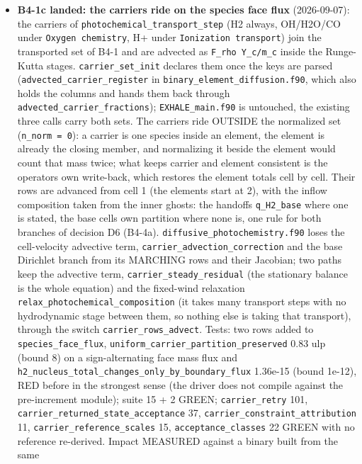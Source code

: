 \documentclass[english,a4paper]{my_memo}
\begin{document}
\begin{itemize}
\item
  \textbf{B4-1c landed: the carriers ride on the species face flux} (2026-09-07):
  the carriers of \texttt{photochemical\_transport\_step} (H2 always, OH/H2O/CO under
  \texttt{Oxygen\ chemistry}, H+ under \texttt{Ionization\ transport}) join the transported
  set of B4-1 and are advected as \texttt{F\_rho\ Y\_c/m\_c} inside the Runge-Kutta
  stages. \texttt{carrier\_set\_init} declares them once the keys are parsed
  (\texttt{advected\_carrier\_register} in \texttt{binary\_element\_diffusion.f90}, which also
  holds the columns and hands them back through
  \texttt{advected\_carrier\_fractions}); \texttt{EXHALE\_main.f90} is untouched, the existing
  three calls carry both sets. The carriers ride OUTSIDE the normalized set
  (\texttt{n\_norm\ =\ 0}): a carrier is one species inside an element, the element is
  already the closing member, and normalizing it beside the element would
  count that mass twice; what keeps carrier and element consistent is the
  operator\textquotesingle s own write-back, which restores the element totals cell by cell.
  Their rows are advanced from cell 1 (the elements\textquotesingle{} start at 2), with the
  inflow composition taken from the inner ghosts: the handoff\textquotesingle s \texttt{q\_H2\_base}
  where one is stated, the base cell\textquotesingle s own partition where none is, one rule
  for both branches of decision D6 (B4-4a). \texttt{diffusive\_photochemistry.f90}
  loses the cell-velocity advective term, \texttt{carrier\_advection\_correction} and
  the base Dirichlet branch from its MARCHING rows and their Jacobian; two
  paths keep the advective term, \texttt{carrier\_steady\_residual} (the stationary
  balance is the whole equation) and the fixed-wind relaxation
  \texttt{relax\_photochemical\_composition} (it takes many transport steps with no
  hydrodynamic stage between them, so nothing else is taking that transport),
  through the switch \texttt{carrier\_rows\_advect}. Tests: two rows added to
  \texttt{species\_face\_flux}, \texttt{uniform\_carrier\_partition\_preserved} 0.83 ulp (bound
  8) on a sign-alternating face mass flux and
  \texttt{h2\_nucleus\_total\_changes\_only\_by\_boundary\_flux} 1.36e-15 (bound 1e-12),
  RED before in the strongest sense (the driver does not compile against the
  pre-increment module); suite 15 + 2 GREEN; \texttt{carrier\_retry} 101,
  \texttt{carrier\_returned\_state\_acceptance} 37, \texttt{carrier\_constraint\_attribution}
  11, \texttt{carrier\_reference\_scales} 15, \texttt{acceptance\_classes} 22 GREEN with no
  reference re-derived. Impact MEASURED against a binary built from the same

\end{itemize}
\end{document}
